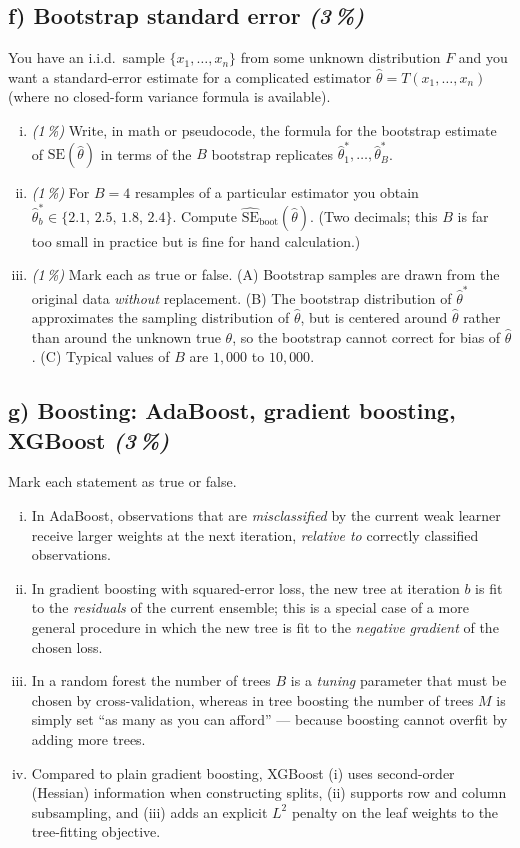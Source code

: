 \documentclass[11pt,a4paper]{article}
\newcommand{\subpoints}[1]{\textit{(#1\,\%)}}
\begin{document}
\subsection*{f) Bootstrap standard error \subpoints{3}}

You have an i.i.d.\ sample $\{x_1,\ldots,x_n\}$ from some unknown distribution $F$ and you want a standard-error estimate for a complicated estimator $\hat\theta = T(x_1,\ldots,x_n)$ (where no closed-form variance formula is available).

\begin{enumerate}[(i)]
  \item \subpoints{1} Write, in math or pseudocode, the formula for the bootstrap estimate of $\mathrm{SE}(\hat\theta)$ in terms of the $B$ bootstrap replicates $\hat\theta_1^*,\ldots,\hat\theta_B^*$.
  \item \subpoints{1} For $B=4$ resamples of a particular estimator you obtain $\hat\theta_b^* \in \{2.1,\, 2.5,\, 1.8,\, 2.4\}$. Compute $\widehat{\mathrm{SE}}_{\mathrm{boot}}(\hat\theta)$. (Two decimals; this $B$ is far too small in practice but is fine for hand calculation.)
  \item \subpoints{1} Mark each as true or false. (A) Bootstrap samples are drawn from the original data \emph{without} replacement. (B) The bootstrap distribution of $\hat\theta^*$ approximates the sampling distribution of $\hat\theta$, but is centered around $\hat\theta$ rather than around the unknown true $\theta$, so the bootstrap cannot correct for bias of $\hat\theta$. (C) Typical values of $B$ are $1{,}000$ to $10{,}000$.
\end{enumerate}

\subsection*{g) Boosting: AdaBoost, gradient boosting, XGBoost \subpoints{3}}
Mark each statement as true or false.
\begin{enumerate}[(i)]
  \item In AdaBoost, observations that are \emph{misclassified} by the current weak learner receive larger weights at the next iteration, \emph{relative to} correctly classified observations.
  \item In gradient boosting with squared-error loss, the new tree at iteration $b$ is fit to the \emph{residuals} of the current ensemble; this is a special case of a more general procedure in which the new tree is fit to the \emph{negative gradient} of the chosen loss.
  \item In a random forest the number of trees $B$ is a \emph{tuning} parameter that must be chosen by cross-validation, whereas in tree boosting the number of trees $M$ is simply set ``as many as you can afford'' --- because boosting cannot overfit by adding more trees.
  \item Compared to plain gradient boosting, XGBoost (i) uses second-order (Hessian) information when constructing splits, (ii) supports row and column subsampling, and (iii) adds an explicit $L^2$ penalty on the leaf weights to the tree-fitting objective.
\end{enumerate}
\end{document}
